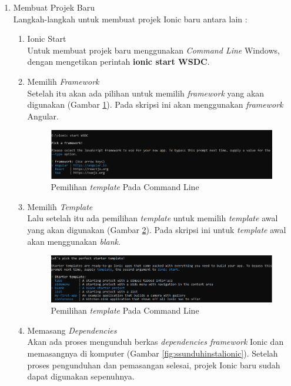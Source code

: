 \begin{enumerate}
	\begin{enumerate}
		\item Membuat Projek Baru \\
		Langkah-langkah untuk membuat projek Ionic baru antara lain :
		\begin{enumerate}
			\item Ionic Start \\
			Untuk membuat projek baru menggunakan {\it Command Line} Windows, dengan mengetikan perintah \textbf{ionic start WSDC}.
			\item Memilih {\it Framework} \\
			Setelah itu akan ada pilihan untuk memilih {\it framework} yang akan digunakan (Gambar \ref{fig:memilihframework}). Pada skripsi ini akan menggunakan {\it framework} Angular.
			\begin{figure}[H]
			    \centering
			    \includegraphics[scale=0.6]{Gambar/ssmemilhframework.png}
			    \caption{Pemilihan {\it template} Pada Command Line}
			    \label{fig:memilihframework}
			\end{figure}			
			\newpage
			\item Memilih {\it Template} \\
			Lalu setelah itu ada pemilihan {\it template} untuk memilih {\it template} awal yang akan digunakan (Gambar \ref{fig:memilihtemplate}). Pada skripsi ini untuk {\it template} awal akan menggunakan {\it blank}.
			\begin{figure}[H]
			    \centering
			    \includegraphics[scale=0.6]{Gambar/ssmemilihtemplate.png}
			    \caption{Pemilihan {\it template} Pada Command Line}
			    \label{fig:memilihtemplate}
			\end{figure}
			\item Memasang {\it Dependencies} \\
			Akan ada proses mengunduh berkas {\it dependencies framework} Ionic dan memasangnya di komputer (Gambar \ref{fig:ssunduhinstalionic}). Setelah proses pengunduhan dan pemasangan selesai, projek Ionic baru sudah dapat digunakan sepenuhnya.

\end{enumerate}
\end{enumerate}
\end{enumerate}
